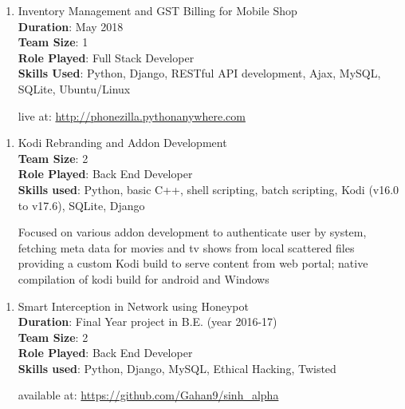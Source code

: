 \documentclass[a4paper, 14pt]{article}
\begin{document}
	
	\begin{enumerate}[start=1,label={\bfseries $\Rightarrow$ TITLE - }]
		\addtolength{\itemindent}{40pt}
		\item Inventory Management and GST Billing for Mobile Shop
		\\ \textbf{Duration}: May 2018
		\\ \textbf{Team Size}: 1
		\\ \textbf{Role Played}: Full Stack Developer
		\\ \textbf{Skills Used}: Python, Django, RESTful API development, Ajax, MySQL, SQLite, Ubuntu/Linux
		
		live at: \url{http://phonezilla.pythonanywhere.com}
	\end{enumerate}
	
	\begin{enumerate}[start=1,label={\bfseries $\Rightarrow$ TITLE - }]
		\addtolength{\itemindent}{40pt}
		\item Kodi Rebranding and Addon Development
		\\ \textbf{Team Size}: 2
		\\ \textbf{Role Played}: Back End Developer
		\\ \textbf{Skills used}: Python, basic C++, shell scripting, batch scripting, Kodi (v16.0 to v17.6), SQLite, Django
		
		Focused on various addon development to authenticate user by system, fetching meta data for movies and tv shows from local scattered files providing a custom Kodi build to serve content from web portal; native compilation of kodi build for android and Windows
	\end{enumerate}
	
	\begin{enumerate}[start=1,label={\bfseries $\Rightarrow$ TITLE - }]
		\addtolength{\itemindent}{40pt}
		\item Smart Interception in Network using Honeypot
		\\ \textbf{Duration}: Final Year project in B.E. (year 2016-17)
		\\ \textbf{Team Size}: 2
		\\ \textbf{Role Played}: Back End Developer
		\\ \textbf{Skills used}: Python, Django, MySQL, Ethical Hacking, Twisted
		
		available at: \url{https://github.com/Gahan9/sinh_alpha}
	\end{enumerate}
\end{document}
